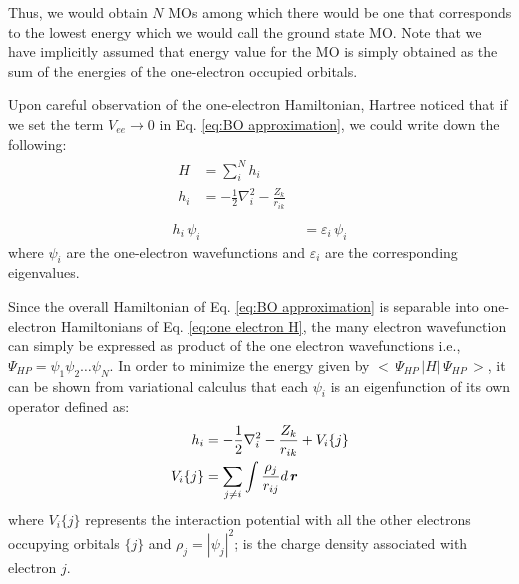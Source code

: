             Thus, we would obtain $N$ MOs among which there would be one that corresponds to the lowest energy which we would call the ground state MO. Note that we have implicitly assumed that energy value for the MO is simply obtained as the sum of the energies of the one-electron occupied orbitals.

            Upon careful observation of the one-electron Hamiltonian, Hartree noticed that if we set the term $V_{ee} \to 0$ in Eq. \eqref{eq:BO approximation}, we could write down the following:
            \begin{subequations}
                \begin{align}
                    \begin{split}
                        H &= \displaystyle\sum_i^N h_i\\
                        h_i &= -\frac{1}{2} \nabla^2_i - \frac{Z_k}{r_{ik}} \label{eq:one electron H}\\
                    \end{split}\\
                    h_i\,\psi_i\, &= \varepsilon_i \, \psi_i \label{eq:one electron SE}
                \end{align}
            \end{subequations}
            where $\psi_i$ are the one-electron wavefunctions and $\varepsilon_i$ are the corresponding eigenvalues.

            Since the overall Hamiltonian of Eq. \eqref{eq:BO approximation} is separable into one-electron Hamiltonians of Eq. \eqref{eq:one electron H}, the many electron wavefunction can simply be expressed as product of the one electron wavefunctions i.e., $\Psi_{HP} = \psi_1 \psi_2 \ldots \psi_N$. In order to minimize the energy given by $<\,\Psi_{HP}\, | H |\,\Psi_{HP}\,>$, it can be shown from variational calculus that each $\psi_i$ is an eigenfunction of its own operator defined as:
            \begin{equation}\label{eq:correct Hamiltonian}
                \begin{aligned}
                    h_i &= -\frac{1}{2} \nabla^2_i - \frac{Z_k}{r_{ik}} + V_i \{j\}\\
                    V_i \{j\} &= \displaystyle\sum_{j \ne i} \int \frac{\rho_j}{r_{ij}} d\,{\boldsymbol {r}}
                \end{aligned}
            \end{equation}
            where $V_i \{j\}$ represents the interaction potential with all the other electrons occupying orbitals $\{j\}$ and $\rho_j = |\psi_j|^2$; is the charge density associated with electron $j$.

